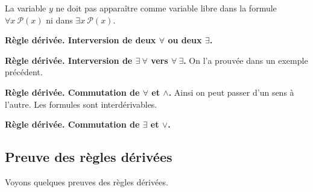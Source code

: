 \documentclass[11pt,class=report,crop=false]{standalone}
\begin{document}
La variable $y$ ne doit pas apparaître comme variable libre dans la formule $\forall x \ \mathcal{P}(x)$ ni dans $\exists x \ \mathcal{P}(x)$.

\bigskip

\textbf{Règle dérivée. Interversion de deux $\forall$ ou deux $\exists$.}

\bigskip

\textbf{Règle dérivée. Interversion de $\exists \  \forall$ vers $\forall \ \exists$.}	
On l'a prouvée dans un exemple précédent. 


\bigskip

\textbf{Règle dérivée. Commutation de $\forall$ et $\land$.}
Ainsi on peut passer d'un sens à l'autre. Les formules sont interdérivables.

\bigskip

\textbf{Règle dérivée. Commutation de $\exists$ et $\lor$.}

\subsection{Preuve des règles dérivées}

Voyons quelques preuves des règles dérivées.
\end{document}
